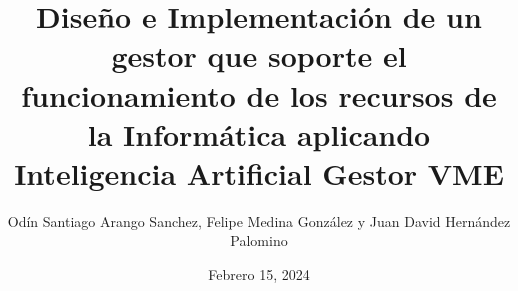 \documentclass{beamer}
\title{Diseño e Implementación de un gestor que soporte el
funcionamiento de los recursos de la Informática aplicando
Inteligencia Artificial \break
Gestor VME}
\institute{Universidad Central}
\date{Febrero 15, 2024}
\author{Odín Santiago Arango Sanchez,
Felipe Medina González y
Juan David Hernández Palomino}
\begin{document}
\begin{frame}
  \titlepage
\end{frame}





\end{document}
